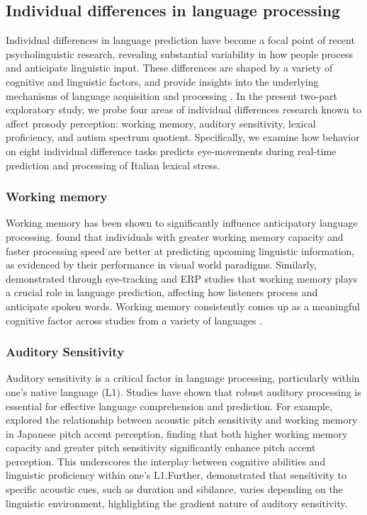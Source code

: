 \subsection{Individual differences in language processing}

Individual differences in language prediction have become a focal point of recent psycholinguistic research, revealing substantial variability in how people process and anticipate linguistic input. These differences are shaped by a variety of cognitive and linguistic factors, and provide insights into the underlying mechanisms of language acquisition and processing \citep{Huettig2016,Li2023,Kidd2018}. In the present two-part exploratory study, we probe four areas of individual differences research known to affect prosody perception: working memory, auditory sensitivity, lexical proficiency, and autism spectrum quotient. Specifically, we examine how behavior on eight individual difference tasks predicts eye-movements during real-time prediction and processing of Italian lexical stress.

\subsubsection{Working memory}
Working memory has been shown to significantly influence anticipatory language processing. \cite{Huettig2016} found that individuals with greater working memory capacity and faster processing speed are better at predicting upcoming linguistic information, as evidenced by their performance in visual world paradigms. Similarly, \cite{Li2023} demonstrated through eye-tracking and ERP studies that working memory plays a crucial role in language prediction, affecting how listeners process and anticipate spoken words. Working memory consistently comes up as a meaningful cognitive factor across studies from a variety of languages \citep{mchaney_et_al_2021_workingmemory,goss_2014,hadar_2016}. 

\subsubsection{Auditory Sensitivity}
Auditory sensitivity is a critical factor in language processing, particularly within one's native language (L1). Studies have shown that robust auditory processing is essential for effective language comprehension and prediction. For example, \cite{goss_2014} explored the relationship between acoustic pitch sensitivity and working memory in Japanese pitch accent perception, finding that both higher working memory capacity and greater pitch sensitivity significantly enhance pitch accent perception. This underscores the interplay between cognitive abilities and linguistic proficiency within one's L1.Further, \cite{Pajak_2014} demonstrated that sensitivity to specific acoustic cues, such as duration and sibilance, varies depending on the linguistic environment, highlighting the gradient nature of auditory sensitivity. 

